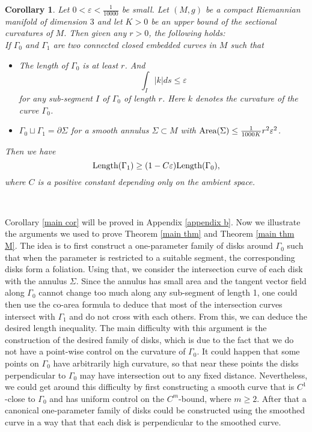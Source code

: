 \documentclass[a4paper, reqno]{amsart}
\newtheorem{corollary}[theorem]{Corollary}
\theoremstyle{definition}
\theoremstyle{remark}
\numberwithin{equation}{section}
\newcommand{\Len}{\textup{Length}}
\numberwithin{equation}{section}
\numberwithin{equation}{section}
\begin{document}
\begin{corollary}{\label{main cor}}
			Let $0<\varepsilon<\frac{1}{10000}$ be small. Let $(M,g)$ be a compact Riemannian manifold of dimension $3$ and let $K>0$ be an upper bound of the sectional curvatures of $M$. Then given any $r>0$, the following holds:\\
			
			 If $\Gamma_0$ and $\Gamma_1$ are two connected closed embedded curves in $M$ such that
	\begin{itemize}
		\item[(i)] The length of $\Gamma_0$ is at least $r$. And 
			\[\int_I|k|ds\leq \varepsilon\]
			for any sub-segment $I$ of $\Gamma_0$ of length $r$. Here $k$ denotes the curvature of the curve $\Gamma_0$.
			\item[(ii)] $\Gamma_0\sqcup \Gamma_1 = \partial\Sigma$ for a smooth annulus $\Sigma\subset M$ with $\textup{Area}(\Sigma)\leq \frac{1}{1000K}r^2\varepsilon^2$.
	\end{itemize}
Then we have
\[\Len(\Gamma_1)\geq (1-C\varepsilon) \Len(\Gamma_0),\]
where $C$ is a positive constant depending only on the ambient space.
\end{corollary}\

Corollary \ref{main cor} will be proved in Appendix \ref{appendix b}. Now we illustrate the arguments we used to prove Theorem \ref{main thm} and Theorem \ref{main thm M}. The idea is to first construct a one-parameter family of disks around  $\Gamma_0$ such that when the parameter is restricted to a suitable segment, the corresponding disks form a foliation. Using that, we consider the intersection curve of each disk with the annulus $\Sigma$. Since the annulus has small area and the tangent vector field along $\Gamma_0$ cannot change too much along any sub-segment of length 1, one could then use the co-area formula to deduce that most of the intersection curves intersect with $\Gamma_1$ and do not cross with each others. From this, we can deduce the desired length inequality. The main difficulty with this argument is the construction of the desired family of disks, which is due to the fact that we do not have a point-wise control on the curvature of $\Gamma_0$. It could happen that some points on $\Gamma_0$ have arbitrarily high curvature, so that near these points the disks perpendicular to $\Gamma_0$ may have intersection out to any fixed distance. Nevertheless, we could get around this difficulty by first constructing a smooth curve that is $C^1$-close to $\Gamma_0$ and has uniform control on the $C^m$-bound, where $m\geq2$. After that a canonical one-parameter family of disks could be constructed using the smoothed curve in a way that that each disk is perpendicular to the smoothed curve.\\
\end{document}
